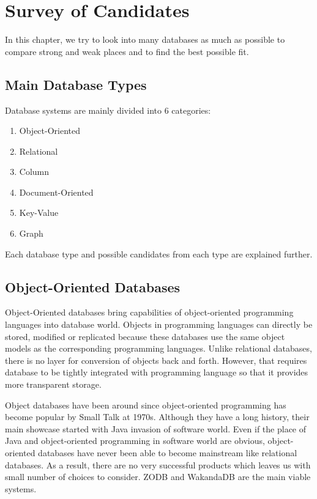 
\chapter{Survey of Candidates} %

\par In this chapter, we try to look into many databases as much as possible to compare strong and weak places and to find the best possible fit.

\section{Main Database Types}

Database systems are mainly divided into 6 categories:

\begin{enumerate}
  \item Object-Oriented
  \item Relational
  \item Column
  \item Document-Oriented
  \item Key-Value
  \item Graph
\end{enumerate}

Each database type and possible candidates from each type are explained further.

\section{Object-Oriented Databases}

Object-Oriented databases bring capabilities of object-oriented programming languages into database world. Objects in programming languages can directly be stored, modified or replicated because these databases use the same object models as the corresponding programming languages. Unlike relational databases, there is no layer for conversion of objects back and forth. However, that requires database to be tightly integrated with programming language so that it provides more transparent storage.

Object databases have been around since object-oriented programming has become popular by Small Talk at 1970s. Although they have a long history, their main showcase started with Java invasion of software world. Even if the place of Java and object-oriented programming in software world are obvious, object-oriented databases have never been able to become mainstream like relational databases. As a result, there are no very successful products which leaves us with small number of choices to consider. ZODB and WakandaDB are the main viable systems.

